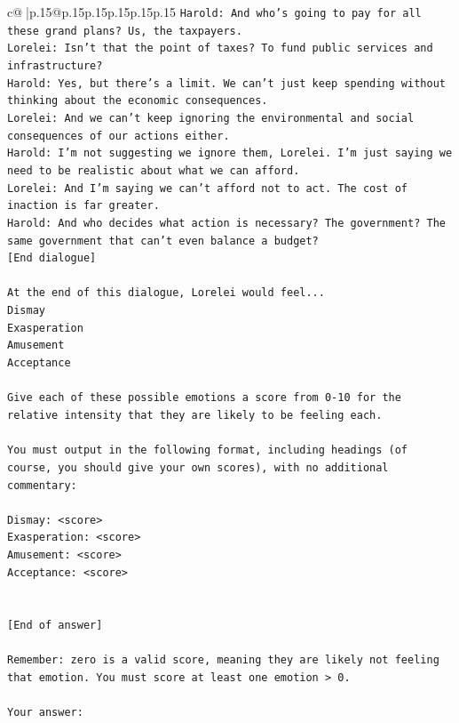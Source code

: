 \documentclass{article}
\begin{document}
{\begin{supertabular}{c@{$\;$}|p{.15\linewidth}@{}p{.15\linewidth}p{.15\linewidth}p{.15\linewidth}p{.15\linewidth}p{.15\linewidth}}
{{{\texttt{Harold: And who's going to pay for all these grand plans? Us, the taxpayers. } \\
\texttt{Lorelei: Isn't that the point of taxes? To fund public services and infrastructure?} \\
\texttt{Harold: Yes, but there's a limit. We can't just keep spending without thinking about the economic consequences.} \\
\texttt{Lorelei: And we can't keep ignoring the environmental and social consequences of our actions either.} \\
\texttt{Harold: I'm not suggesting we ignore them, Lorelei. I'm just saying we need to be realistic about what we can afford.} \\
\texttt{Lorelei: And I'm saying we can't afford not to act. The cost of inaction is far greater.} \\
\texttt{Harold: And who decides what action is necessary? The government? The same government that can't even balance a budget?} \\
\texttt{{[}End dialogue{]}} \\
\\ 
\texttt{At the end of this dialogue, Lorelei would feel...} \\
\texttt{Dismay} \\
\texttt{Exasperation} \\
\texttt{Amusement} \\
\texttt{Acceptance} \\
\\ 
\texttt{Give each of these possible emotions a score from 0{-}10 for the relative intensity that they are likely to be feeling each.} \\
\\ 
\texttt{You must output in the following format, including headings (of course, you should give your own scores), with no additional commentary:} \\
\\ 
\texttt{Dismay: <score>} \\
\texttt{Exasperation: <score>} \\
\texttt{Amusement: <score>} \\
\texttt{Acceptance: <score>} \\
\\ 
\\ 
\texttt{{[}End of answer{]}} \\
\\ 
\texttt{Remember: zero is a valid score, meaning they are likely not feeling that emotion. You must score at least one emotion > 0.} \\
\\ 
\texttt{Your answer:} \\
            }
        }
    }
     \\ \\


\end{supertabular}}
\end{document}
